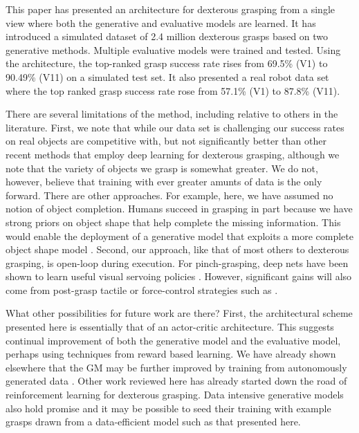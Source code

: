 This paper has presented an architecture for dexterous grasping from a single view where both the generative and evaluative models are learned. It has introduced a simulated dataset of 2.4 million dexterous grasps based on two generative methods. Multiple evaluative models were trained and tested. Using the architecture, the top-ranked grasp success rate  rises from 69.5\% (V1) to 90.49\% (V11) on a simulated test set. It also presented a real robot data set where the top ranked grasp success rate rose from 57.1\% (V1) to 87.8\% (V11).

There are several limitations of the method, including relative to others in the literature. First, we note that while our data set is challenging our success rates on real objects are competitive with, but not significantly better than other recent methods that employ deep learning for dexterous grasping, although we note that the variety of objects we grasp is somewhat greater. We do not, however, believe that training with ever greater amunts of data is the only forward. There are other approaches. For example, here, we have assumed no notion of object completion. Humans succeed in grasping in part because we have strong priors on object shape that help complete the missing information. This would enable the deployment of a generative model that exploits a more complete object shape model \cite{kopicki2015ijrr}. Second, our approach, like that of most others to dexterous grasping, is open-loop during execution. For pinch-grasping, deep nets have been shown to learn useful visual servoing policies \cite{morrison18}. However, significant gains will also come from post-grasp tactile or force-control strategies such as \cite{Torres2018}.

What other possibilities for future work are there? First, the architectural scheme presented here is essentially that of an actor-critic architecture. This suggests continual improvement of both the generative model and the evaluative model, perhaps using techniques from reward based learning. We have already shown elsewhere that the GM may be further improved by training from autonomously generated data \cite{kopicki2019ijrr}. Other work reviewed here \cite{mandikal2021dexterous,Osa2018} has already started down the road of reinforcement learning for dexterous grasping. Data intensive generative models also hold promise \cite{veres2017modeling,Shao2020,Shang2020,Zhao2020} and it may be possible to seed their training with example grasps drawn from a data-efficient model such as that presented here.\\